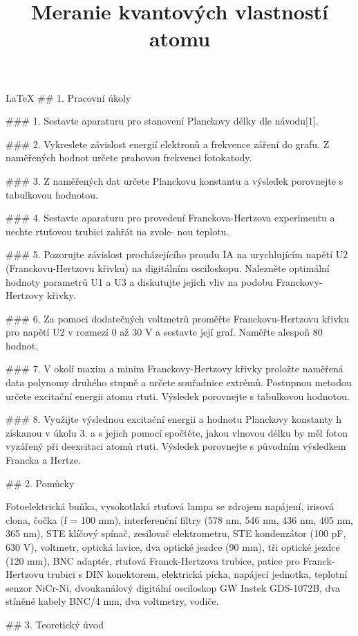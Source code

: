 \documentclass{article}
\title{Meranie kvantových vlastností atomu}
\begin{document}
  \maketitle
  \LaTeX{} 
## 1. Pracovní úkoly

### 1. Sestavte aparaturu pro stanovení Planckovy délky dle návodu[1].

### 2. Vykreslete závislost energií elektronů a frekvence záření do grafu. Z naměřených hodnot určete prahovou
frekvenci fotokatody.

### 3. Z naměřených dat určete Planckovu konstantu a výsledek porovnejte s tabulkovou hodnotou.

### 4. Sestavte aparaturu pro provedení Franckova-Hertzova experimentu a nechte rtuťovou trubici zahřát na zvole-
nou teplotu.

### 5. Pozorujte závislost procházejícího proudu IA na urychlujícím napětí U2 (Franckovu-Hertzovu křivku) na
digitálním osciloskopu. Nalezněte optimální hodnoty parametrů U1 a U3 a diskutujte jejich vliv na podobu
Franckovy-Hertzovy křivky.

### 6. Za pomoci dodatečných voltmetrů proměřte Franckovu-Hertzovu křivku pro napětí U2 v rozmezí 0 až 30 V a
sestavte její graf. Naměřte alespoň 80 hodnot.

### 7. V okolí maxim a minim Franckovy-Hertzovy křivky proložte naměřená data polynomy druhého stupně a
určete souřadnice extrémů. Postupnou metodou určete excitační energii atomu rtuti. Výsledek porovnejte
s tabulkovou hodnotou.

### 8. Využijte výslednou excitační energii a hodnotu Planckovy konstanty h získanou v úkolu 3. a s jejich pomocí
spočtěte, jakou vlnovou délku by měl foton vyzářený při deexcitaci atomů rtuti. Výsledek porovnejte s původním
výsledkem Francka a Hertze.


## 2. Pomůcky

Fotoelektrická buňka, vysokotlaká rtuťová lampa se zdrojem napájení, irisová clona, čočka (f = 100 mm),
interferenční filtry (578 nm, 546 nm, 436 nm, 405 nm, 365 nm), STE klíčový spínač, zesilovač elektrometru, STE
kondenzátor (100 pF, 630 V), voltmetr, optická lavice, dva optické jezdce (90 mm), tři optické jezdce (120 mm),
BNC adaptér, rtuťová Franck-Hertzova trubice, patice pro Franck-Hertzovu trubici s DIN konektorem, elektrická
pícka, napájecí jednotka, teplotní senzor NiCr-Ni, dvoukanálový digitální osciloskop GW Instek GDS-1072B, dva
stíněné kabely BNC/4 mm, dva voltmetry, vodiče.


## 3. Teoretický úvod
\end{document}
